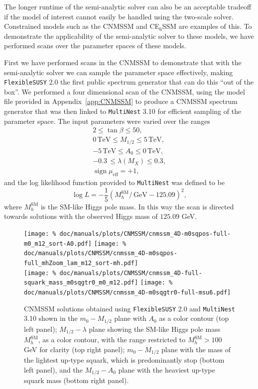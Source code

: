 \documentclass[final,3p,11pt,pdflatex]{elsarticle}
\makeatletter
\newcommand{\fs}{\texttt{FlexibleSUSY}\@\xspace}
\newcommand{\multinest}{\texttt{MultiNest}\@\xspace}
\newcommand{\fstwo}{\fs 2.0\@\xspace}
\newcommand{\ESSM}{E$_6$SSM\@\xspace}
\newcommand{\unit}[1]{\,\text{#1}}      %
\newcommand{\SM}{\ensuremath{\text{SM}}\xspace}
\newcommand{\appref}[1]{Appendix~\ref{#1}}
\newcommand{\azero}{\ensuremath{A_0}\xspace}
\newcommand{\mhalf}{\ensuremath{M_{1/2}}\xspace}
\newcommand{\mzero}{\ensuremath{m_0}\xspace}
\DeclareMathOperator{\sign}{sign}
\makeatother
\begin{document}
The longer runtime of the semi-analytic solver can also be an
acceptable tradeoff if the model of interest cannot easily be
handled using the two-scale solver.  Constrained models such as the
CNMSSM and C\ESSM are examples of this.  To demonstrate the applicability of
the semi-analytic solver to these models, we have performed
scans over the parameter spaces of these models.

First we have performed scans in the CNMSSM to demonstrate that with the
semi-analytic solver we can sample the parameter space effectively, making
\fstwo the first public spectrum generator that can do this ``out of the box''.
We performed a four dimensional scan of the CNMSSM, using the model file
provided in \appref{app:CNMSSM} to produce a CNMSSM spectrum generator that
was then linked to \multinest 3.10 for efficient sampling of the parameter
space.  The input parameters were varied over the ranges
\begin{gather}
  2 \leq \tan \beta \leq 50, \\
  0\unit{TeV} \leq \mhalf \leq 5\unit{TeV}, \\
  -5\unit{TeV} \leq \azero \leq 0\unit{TeV}, \\
  -0.3 \, \leq \lambda(M_X) \leq 0.3, \\
  \sign \mu_{\textrm{eff}}  = +1,
\end{gather}
and the log likelihood function provided to \multinest was defined to be
\begin{equation*}
  \log L = -\frac{1}{5}({M_h^{\SM}}/{\unit{GeV}} - 125.09)^2 ,
\end{equation*}
where $M_h^{\SM}$ is the SM-like Higgs pole mass.  In this way the
scan is directed towards solutions with the observed Higgs mass of
$125.09$ GeV\@.

\begin{figure}[tbh]
  \centering
  \texttt{[image: \%
    doc/manuals/plots/CNMSSM/cnmssm\_4D-m0sqpos-full-m0\_m12\_sort-A0.pdf]}
   \texttt{[image: \%
    doc/manuals/plots/CNMSSM/cnmssm\_4D-m0sqpos-full\_mhZoom\_lam\_m12\_sort-mh.pdf]} \\
  \texttt{[image: \%
    doc/manuals/plots/CNMSSM/cnmssm\_4D-full-squark\_mass\_m0sqgtr0\_m0\_m12.pdf]}
   \texttt{[image: \%
    doc/manuals/plots/CNMSSM/cnmssm\_4D-m0sqgtr0-full-msu6.pdf]}
   \caption{CNMSSM solutions obtained using \fstwo and \multinest 3.10
     shown in the $\mzero-\mhalf$ plane with $\azero$ as a color
     contour (top left panel); $\mhalf-\lambda$ plane showing the
     SM-like Higgs pole mass $M_h^{\SM} $, as a color contour, with
     the range restricted to $M_h^{\SM} > 100$ GeV for clarity (top
     right panel); $\mzero-\mhalf$ plane with the mass of the lightest
     up-type squark, which is predominantly stop (bottom left panel),
     and the $\mhalf-\azero$ plane with the heaviest up-type squark
     mass (bottom right panel).}
   \label{fig:cnmssm_solutions}
\end{figure}
\end{document}
